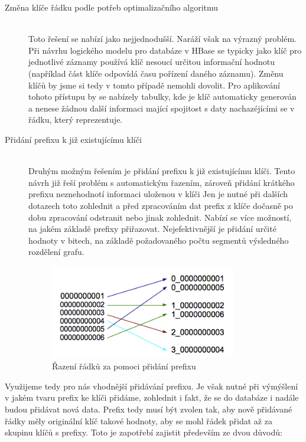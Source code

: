 \documentclass[thesis=M,czech]{FITthesis}[2012/06/26]
\begin{document}
\begin{description}
\item[Změna klíče řádku podle potřeb optimalizačního algoritmu] \hfill \\
 Toto řešení se nabízí jako nejjednodušší. Naráží však na výrazný problém. Při návrhu logického modelu pro databáze v HBase se typicky jako klíč pro jednotlivé záznamy používá klíč nesoucí určitou informační hodnotu (například část klíče odpovídá času pořízení daného záznamu). Změnu klíčů by jsme si tedy v tomto případě nemohli dovolit. Pro aplikování tohoto přístupu by se nabízely tabulky, kde je klíč automaticky generován a nenese žádnou další informaci mající spojitost s daty nachazéjícími se v řádku, který reprezentuje.
 
 \item[Přidání prefixu k již existujícímu klíči] \hfill \\
 Druhým možným řešením je přidání prefixu k již existujícímu klíči. Tento návrh již řeší problém s automatickým řazením, zároveň přidání krátkého prefixu neznehodnotí informaci uloženou v klíči Jen je nutné při dalších dotazech toto zohlednit a před zpracováním dat prefix z klíče dočasně po dobu zpracování odstranit nebo jinak zohlednit. Nabízí se více možností, na jakém základě prefixy přiřazovat. Nejefektivnější je přidání určité hodnoty v bitech, na základě požadovaného počtu segmentů výsledného rozdělení grafu. 
 
 \begin{figure}[h]\centering
	\includegraphics[width=0.8\textwidth, angle=0]{files/rows}
	\caption[Řazení řádků za pomoci přidání prefixu]
	{Řazení řádků za pomoci přidání prefixu}\label{fig:keys}
\end{figure} 
 
\end{description} 

Využijeme tedy pro nás vhodnější přidávání prefixu. Je však nutné při výmýšlení v jakém tvaru prefix ke klíči přidáme, zohlednit i fakt, že se do databáze i nadále budou přidávat nová data. Prefix tedy musí být zvolen tak, aby nově přidávané řádky měly originální klíč takové hodnoty, aby se mohl řádek přidat až za skupinu klíčů s prefixy. Toto je zapotřebí zajistit především ze dvou důvodů:
\end{document}
